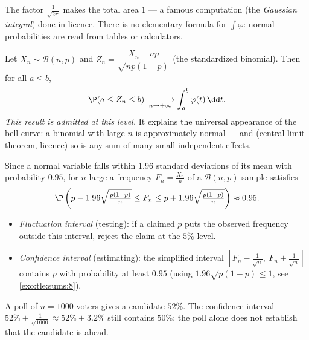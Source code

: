 \begin{remark}
The factor $\frac{1}{\sqrt{2\pi}}$ makes the total area $1$ --- a famous
computation (the \emph{Gaussian integral}) done in licence. There is no
elementary formula for $\int \varphi$: normal probabilities are read from
tables or calculators.
\end{remark}

\begin{theorem}\label{thm:tle:contdist:tcl}
Let $X_n \sim \mathcal B(n, p)$ and
$Z_n = \dfrac{X_n - np}{\sqrt{np(1-p)}}$ (the standardized binomial). Then
for all $a \leq b$,
\[
\P(a \leq Z_n \leq b) \xrightarrow[n\to+\infty]{}
\int_a^b \varphi(t)\,\dd t .
\]
\emph{This result is admitted at this level.} It explains the universal
appearance of the bell curve: a binomial with large $n$ is approximately
normal --- and (central limit theorem, licence) so is any sum of many small
independent effects.
\end{theorem}

\begin{method}\label{met:tle:contdist:fluctuation}
Since a normal variable falls within $1.96$ standard deviations of its mean
with probability $0.95$, for $n$ large a frequency
$F_n = \frac{X_n}{n}$ of a $\mathcal B(n,p)$ sample satisfies
\[
\P\left(p - 1.96\sqrt{\tfrac{p(1-p)}{n}} \leq F_n \leq
p + 1.96\sqrt{\tfrac{p(1-p)}{n}}\right) \approx 0.95 .
\]
\begin{itemize}
  \item \emph{Fluctuation interval} (testing): if a claimed $p$ puts the
        observed frequency outside this interval, reject the claim at the
        $5\%$ level.
  \item \emph{Confidence interval} (estimating): the simplified interval
        $\left[F_n - \frac{1}{\sqrt n},\ F_n + \frac{1}{\sqrt n}\right]$
        contains $p$ with probability at least $0.95$
        (using $1.96\sqrt{p(1-p)} \leq 1$, see \cref{exo:tle:sums:8}).
\end{itemize}
\end{method}

\begin{example}\label{ex:tle:contdist:poll}
A poll of $n = 1000$ voters gives a candidate $52\%$. The confidence
interval $52\% \pm \frac{1}{\sqrt{1000}} \approx 52\% \pm 3.2\%$ still
contains $50\%$: the poll alone does not establish that the candidate is
ahead.
\end{example}

